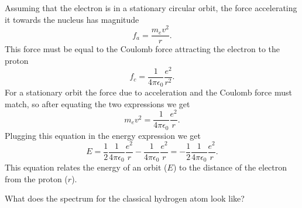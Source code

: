 \documentclass[../Main/chem331-notes.tex]{subfiles}
\begin{document}
Assuming that the electron is in a stationary circular orbit, the force accelerating it towards the nucleus has magnitude
\begin{equation}
f_a = \frac{m_e v^2}{r}.
\end{equation}
This force must be equal to the Coulomb force attracting the electron to the proton
\begin{equation}
f_c =  \frac{1}{4 \pi \epsilon_0} \frac{e^2}{r^2}.
\end{equation}
For a stationary orbit the force due to acceleration and the Coulomb force must match, so after equating the two expressions we get
\begin{equation}
\label{eq:stationary_condition}
m_e v^2 = \frac{1}{4 \pi \epsilon_0} \frac{e^2}{r}.
\end{equation}
Plugging this equation in the energy expression we get
\begin{equation}
E = \frac{1}{2} \frac{1}{4 \pi \epsilon_0} \frac{e^2}{r} - \frac{1}{4 \pi \epsilon_0} \frac{e^2}{r}= - \frac{1}{2} \frac{1}{4 \pi \epsilon_0} \frac{e^2}{r}.
\end{equation}
This equation relates the energy of an orbit ($E$) to the distance of the electron from the proton ($r$).

\begin{exercise}
What does the spectrum for the classical hydrogen atom look like?
\end{exercise}

\end{document}
